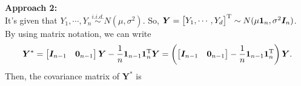 \documentclass[a4paper]{article}
\begin{document}
\vspace{\baselineskip}
\textbf{\large Approach 2:}\\
It's given that $Y_{1}, \cdots, Y_{n} \stackrel{i.i.d.}{\sim} N(\mu, \sigma^2)$. So, $\bm{Y} = \begin{bmatrix} Y_{1}, \cdots, Y_{d} \end{bmatrix}^{\rm T} \sim N(\mu\bm{1}_{n}, \sigma^{2}\bm{I}_{n})$.\\
By using matrix notation, we can write
\begin{align*}
\bm{Y}^{*} = 
\begin{bmatrix}
\bm{I}_{n-1} & \bm{0}_{n-1}
\end{bmatrix}
\bm{Y} -\frac{1}{n}\bm{1}_{n-1}\bm{1}_{n}^{\rm T}\bm{Y}
= \left(
\begin{bmatrix}
\bm{I}_{n-1} & \bm{0}_{n-1}
\end{bmatrix}
-\frac{1}{n}\bm{1}_{n-1}\bm{1}_{n}^{\rm T}
\right)
\bm{Y}.
\end{align*}
Then, the covariance matrix of $\bm{Y}^{*}$ is
\end{document}
